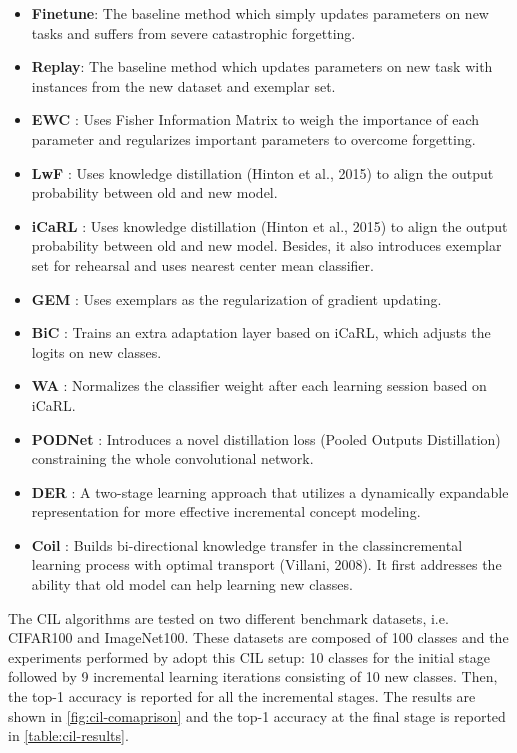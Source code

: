 \begin{itemize}
    \item \textbf{Finetune}: The baseline method which simply updates parameters on new tasks and
    suffers from severe catastrophic forgetting.
    \item \textbf{Replay}: The baseline method which updates parameters on new task with instances
    from the new dataset and exemplar set.
    \item \textbf{EWC} \cite{kirkpatrick2017overcoming}: Uses Fisher Information Matrix to weigh the
    importance of each parameter and regularizes important parameters to overcome forgetting.
    \item \textbf{LwF} \cite{li2017learning}: Uses knowledge distillation (Hinton et al., 2015) to
    align the output probability between old and new model.
    \item \textbf{iCaRL} \cite{rebuffi2017icarl}: Uses knowledge distillation (Hinton et al., 2015) to
    align the output probability between old and new model. Besides, it also introduces
    exemplar set for rehearsal and uses nearest center mean classifier.
    \item \textbf{GEM} \cite{lopez2017gradient}: Uses exemplars as the regularization of
    gradient updating.
    \item \textbf{BiC} \cite{wu2019large}: Trains an extra adaptation layer based on iCaRL, which
    adjusts the logits on new classes.
    \item \textbf{WA} \cite{zhao2020maintaining}: Normalizes the classifier weight after each learning session
    based on iCaRL.
    \item \textbf{PODNet} \cite{douillard2020podnet}: Introduces a novel distillation loss (Pooled
    Outputs Distillation) constraining the whole convolutional network.
    \item \textbf{DER} \cite{yan2021dynamically}: A two-stage learning approach that utilizes a dynamically
    expandable representation for more effective incremental concept modeling.
    \item \textbf{Coil} \cite{zhou2021co}: Builds bi-directional knowledge transfer in the classincremental learning process with optimal transport (Villani, 2008). It first addresses
    the ability that old model can help learning new classes.
\end{itemize}

The CIL algorithms are tested on two different benchmark datasets, i.e. CIFAR100 and ImageNet100. These datasets are composed of 100 classes and the experiments performed by \cite{zhou2021pycil} adopt this CIL setup: 10 classes for the initial stage followed by 9 incremental learning iterations consisting of 10 new classes. Then, the top-1 accuracy is reported for all the incremental stages.
The results are shown in \autoref{fig:cil-comaprison} and the top-1 accuracy at the final stage is reported in \autoref{table:cil-results}.


